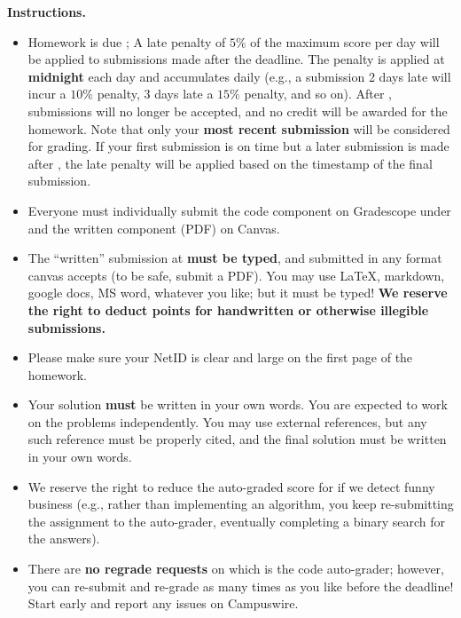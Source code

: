 
\textbf{Instructions.}
\begin{itemize}
\item
   Homework is due \textbf{\duedate}; 
   A late penalty of $5\%$ of the maximum score per day will be applied to submissions made after the deadline. The penalty is applied at \textbf{midnight} each day and accumulates daily (e.g., a submission 2 days late will incur a $10\%$ penalty, 3 days late a $15\%$ penalty, and so on). After \lastduedate, submissions will no longer be accepted, and no credit will be awarded for the homework. Note that only your \textbf{most recent submission} will be considered for grading. If your first submission is on time but a later submission is made after \duedate, the late penalty will be applied based on the timestamp of the final submission.


    \item
    Everyone must individually submit the code component on Gradescope under \hw{} and the written component (PDF) on Canvas.

    \item
    The ``written'' submission at  \hw{} \textbf{must be typed}, and submitted in
    any format canvas accepts (to be safe, submit a PDF).  You may use \LaTeX, markdown,
    google docs, MS word, whatever you like; but it must be typed!
    \textbf{We reserve the right to deduct points for handwritten or otherwise illegible submissions.}

    \item
    Please make sure your NetID is clear and large on the first page of the homework.

  \item
    Your solution \textbf{must} be written in your own words. You are expected
    to work on the problems independently. You may use external
    references, but any such reference must be properly cited, and the
    final solution must be written in your own words.
    
    \item
    We reserve the right to reduce the auto-graded score for \hwc{}
    if we detect funny business (e.g., rather than implementing an algorithm,
    you keep re-submitting the assignment to the auto-grader, eventually completing
    a binary search for the answers).

    \item
    There are \textbf{no regrade requests} on \hwc{} which is the code auto-grader;
    however, you can re-submit and re-grade as many times as you like before the deadline!
    Start early and report any issues on Campuswire.


\end{itemize}
